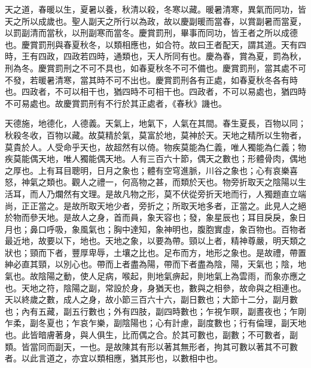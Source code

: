 
天之道，春暖以生，夏暑以養，秋清以殺，冬寒以藏。暖暑清寒，異氣而同功，皆天之所以成歲也。聖人副天之所行以為政，故以慶副暖而當春，以賞副暑而當夏，以罰副清而當秋，以刑副寒而當冬。慶賞罰刑，畢事而同功，皆王者之所以成德也。慶賞罰刑與春夏秋冬，以類相應也，如合符。故曰王者配天，謂其道。天有四時，王有四政，四政若四時，通類也，天人所同有也。慶為春，賞為夏，罰為秋，刑為冬。慶賞罰刑之不可不具也，如春夏秋冬不可不備也。慶賞罰刑，當其處不可不發，若暖暑清寒，當其時不可不出也。慶賞罰刑各有正處，如春夏秋冬各有時也。四政者，不可以相干也，猶四時不可相干也。四政者，不可以易處也，猶四時不可易處也。故慶賞罰刑有不行於其正處者，《春秋》譏也。


天德施，地德化，人德義。天氣上，地氣下，人氣在其間。春生夏長，百物以同；秋殺冬收，百物以藏。故莫精於氣，莫富於地，莫神於天。天地之精所以生物者，莫貴於人。人受命乎天也，故超然有以倚。物疾莫能為仁義，唯人獨能為仁義；物疾莫能偶天地，唯人獨能偶天地。人有三百六十節，偶天之數也；形體骨肉，偶地之厚也。上有耳目聰明，日月之象也；體有空穹進脈，川谷之象也；心有哀樂喜怒，神氣之類也。觀人之禮一，何高物之甚，而類於天也。物旁折取天之陰陽以生活耳，而人乃爛然有文理。是故凡物之形，莫不伏從旁折天地而行，人獨題直立端尚，正正當之。是故所取天地少者，旁折之；所取天地多者，正當之。此見人之絕於物而參天地。是故人之身，首而員，象天容也；發，象星辰也；耳目戾戾，象日月也；鼻口呼吸，象風氣也；胸中達知，象神明也，腹胞實虛，象百物也。百物者最近地，故要以下，地也。天地之象，以要為帶。頸以上者，精神尊嚴，明天類之狀也；頸而下者，豐厚卑辱，土壤之比也。足布而方，地形之象也。是故禮，帶置紳必直其頸，以別心也。帶而上者盡為陽，帶而下者盡為陰，陽，天氣也；陰，地氣也。故陰陽之動，使人足病，喉起，則地氣痹起，則地氣上為雲雨，而象亦應之也。天地之符，陰陽之副，常設於身，身猶天也，數與之相參，故命與之相連也。天以終歲之數，成人之身，故小節三百六十六，副日數也；大節十二分，副月數也；內有五藏，副五行數也；外有四肢，副四時數也；乍視乍瞑，副晝夜也；乍剛乍柔，副冬夏也；乍哀乍樂，副陰陽也；心有計慮，副度數也；行有倫理，副天地也。此皆暗膚著身，與人俱生，比而偶之合。於其可數也，副數；不可數者，副類。皆當同而副天，一也。是故陳其有形以著其無形者，拘其可數以著其不可數者。以此言道之，亦宜以類相應，猶其形也，以數相中也。


